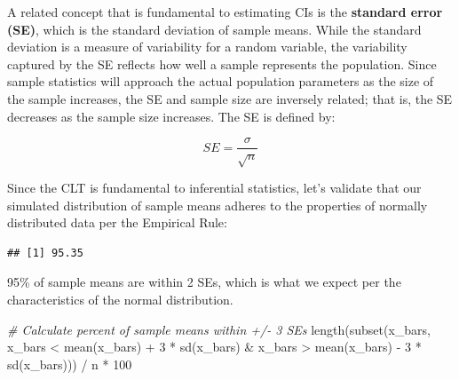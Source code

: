 \documentclass[
]{book}
\newenvironment{Shaded}{\begin{snugshade}}{\end{snugshade}}
\newcommand{\CommentTok}[1]{\textcolor[rgb]{0.56,0.35,0.01}{\textit{#1}}}
\newcommand{\DecValTok}[1]{\textcolor[rgb]{0.00,0.00,0.81}{#1}}
\newcommand{\FunctionTok}[1]{\textcolor[rgb]{0.00,0.00,0.00}{#1}}
\newcommand{\NormalTok}[1]{#1}
\newcommand{\OtherTok}[1]{\textcolor[rgb]{0.56,0.35,0.01}{#1}}
\newcommand{\SpecialCharTok}[1]{\textcolor[rgb]{0.00,0.00,0.00}{#1}}
\newcommand{\StringTok}[1]{\textcolor[rgb]{0.31,0.60,0.02}{#1}}
\begin{document}
A related concept that is fundamental to estimating CIs is the \textbf{standard error (SE)}, which is the standard deviation of sample means. While the standard deviation is a measure of variability for a random variable, the variability captured by the SE reflects how well a sample represents the population. Since sample statistics will approach the actual population parameters as the size of the sample increases, the SE and sample size are inversely related; that is, the SE decreases as the sample size increases. The SE is defined by:

\[ SE = \frac{\sigma}{\sqrt{n}} \]

Since the CLT is fundamental to inferential statistics, let's validate that our simulated distribution of sample means adheres to the properties of normally distributed data per the Empirical Rule:

\begin{Shaded}
\end{Shaded}

\begin{verbatim}
## [1] 95.35
\end{verbatim}

95\% of sample means are within 2 SEs, which is what we expect per the characteristics of the normal distribution.

\begin{Shaded}
\begin{Highlighting}[]
\CommentTok{\# Calculate percent of sample means within +/{-} 3 SEs}
\FunctionTok{length}\NormalTok{(}\FunctionTok{subset}\NormalTok{(x\_bars, x\_bars }\SpecialCharTok{\textless{}} \FunctionTok{mean}\NormalTok{(x\_bars) }\SpecialCharTok{+} \DecValTok{3} \SpecialCharTok{*} \FunctionTok{sd}\NormalTok{(x\_bars) }\SpecialCharTok{\&}\NormalTok{ x\_bars }\SpecialCharTok{\textgreater{}} \FunctionTok{mean}\NormalTok{(x\_bars) }\SpecialCharTok{{-}} \DecValTok{3} \SpecialCharTok{*} \FunctionTok{sd}\NormalTok{(x\_bars))) }\SpecialCharTok{/}\NormalTok{ n }\SpecialCharTok{*} \DecValTok{100}
\end{Highlighting}
\end{Shaded}
\end{document}
